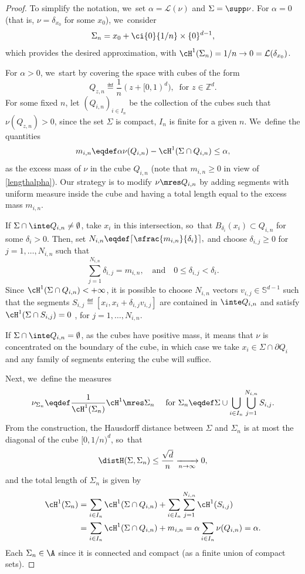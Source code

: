 \begin{proof}
To simplify the notation, we~set $\alpha = \mathcal{L}(\nu)$ and $\Sigma = \supp\nu$.
For $\alpha=0$ (that is, $\nu=\delta_{x_0}$ for some $x_0$), we~consider
\[
\Sigma_n = x_0 + \ci{0}{1/n}\times \{0\}^{d-1},
\]
which provides the desired approximation, with $\cH^1(\Sigma_n) = 1/n \to 0 = \mathcal{L}(\delta_{x_0})$.

For $\alpha>0$, we~start by covering the space with cubes of the form
\[
Q_{z,n} \eqdef \frac{1}{n}( z + [0,1)^d), \ \text{ for $z \in \mathbb{Z}^d$}.
\]
For some fixed $n$, let $\left(Q_{i,n}\right)_{i \in I_n}$ be the collection of the cubes such that $\nu\left(Q_{z,n}\right) > 0$, since the set $\Sigma$ is compact, $I_n$ is finite for a given $n$. We~define the quantities
\[
m_{i,n} \eqdef \alpha \nu(Q_{i,n}) - \cH^1(\Sigma \cap Q_{i,n}) \le \alpha,
\]
as the excess mass of $\nu$ in the cube $Q_{i,n}$ (note that $m_{i,n}\geq 0$ in view of \eqref{lengthalpha}). Our strategy is to modify $\nu\mres Q_{i,n}$ by adding segments with uniform measure inside the cube and having a total length equal to the excess mass $m_{i,n}$.

If $\Sigma \cap \inte Q_{i,n} \neq \emptyset$, take $x_i$ in this intersection, so~that $B_{\delta_i}(x_i) \subset Q_{i,n}$ for some $\delta_i > 0$. Then, set
$
N_{i,n} \eqdef\lceil \sfrac{m_{i,n}}{\delta_i}\rceil,
$
and choose $\delta_{i,j}\ge 0$ for $j = 1, \dots, N_{i,n}$ such that
\[
\sum_{j = 1}^{N_{i,n}} \delta_{i,j} = m_{i,n}, \quad\text{and}\quad 0 \le \delta_{i,j} < \delta_i.
\]
Since $\cH^1(\Sigma\cap Q_{i,n})<+\infty$, it is possible to choose $N_{i,n}$ vectors $v_{i,j} \in \mathbb{S}^{d-1}$ such that the segments $S_{i,j} \eqdef [x_i, x_i + \delta_{i,j}v_{i,j}]$ are contained in $\inte Q_{i,n}$ and satisfy $\cH^1(\Sigma \cap S_{i,j}) = 0$ , for $j = 1, \dots, N_{i,n}$.

If $\Sigma \cap \inte Q_{i,n} = \emptyset$, as the cubes have positive mass, it means that $\nu$ is concentrated on the boundary of the cube, in which case we take $x_i \in \Sigma \cap \partial Q_i$ and any family of segments entering the cube will suffice.

Next, we~define the measures
\[
\nu_{\Sigma_n}
\eqdef
\frac{1}{\cH^1(\Sigma_n)} \cH^1\mres \Sigma_n
\quad \text{ for }
\Sigma_n \eqdef \Sigma \cup \bigcup_{ i \in I_n}\bigcup_{j = 1}^{N_{i,n}} S_{i,j}.
\]
From the construction, the Hausdorff distance between $\Sigma$ and $\Sigma_n$ is at most the diagonal of the cube $[0,1/n)^d$, so~that
\[
\distH(\Sigma, \Sigma_n) \le \frac{\sqrt{d}}{n} \xrightarrow[n \to \infty]{} 0,
\]
and the total length of $\Sigma_n$ is given by
\begin{align*}
\cH^1(\Sigma_n)
&=
\sum_{i \in I_n} \cH^1(\Sigma \cap Q_{i,n})
+
\sum_{i \in I_n}\sum_{j = 1}^{N_{i,n}}\cH^1(S_{i,j})\\
&=
\sum_{i \in I_n}
\cH^1(\Sigma \cap Q_{i,n}) + m_{i,n}
=
\alpha
\sum_{i \in I_n}
\nu(Q_{i,n}) = \alpha.
\end{align*}
Each $\Sigma_n\in \A$ since it is connected and compact (as a finite union of compact sets).


\end{proof}
